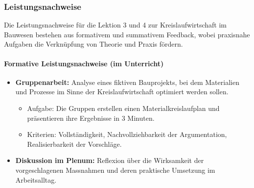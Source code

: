 \documentclass[
11pt,
captions=tableheading,
smallheadings,
headsepline,
footsepline, 
captions=tableheading,
parskip=half-,
]{scrartcl}
\begin{document}
\subsubsection{Leistungsnachweise}


Die Leistungsnachweise für die Lektion 3 und 4 zur Kreislaufwirtschaft im Bauwesen bestehen aus formativem und summativem Feedback, wobei praxisnahe Aufgaben die Verknüpfung von Theorie und Praxis fördern.

\paragraph{Formative Leistungsnachweise (im Unterricht)}
\begin{itemize}
    \item \textbf{Gruppenarbeit:}
          Analyse eines fiktiven Bauprojekts, bei dem Materialien und Prozesse im Sinne der Kreislaufwirtschaft optimiert werden sollen.
          \begin{itemize}
              \item Aufgabe: Die Gruppen erstellen einen Materialkreislaufplan und präsentieren ihre Ergebnisse in 3 Minuten.
              \item Kriterien: Vollständigkeit, Nachvollziehbarkeit der Argumentation, Realisierbarkeit der Vorschläge.
          \end{itemize}
    \item \textbf{Diskussion im Plenum:}
          Reflexion über die Wirksamkeit der vorgeschlagenen Massnahmen und deren praktische Umsetzung im Arbeitsalltag.
\end{itemize}
\end{document}
